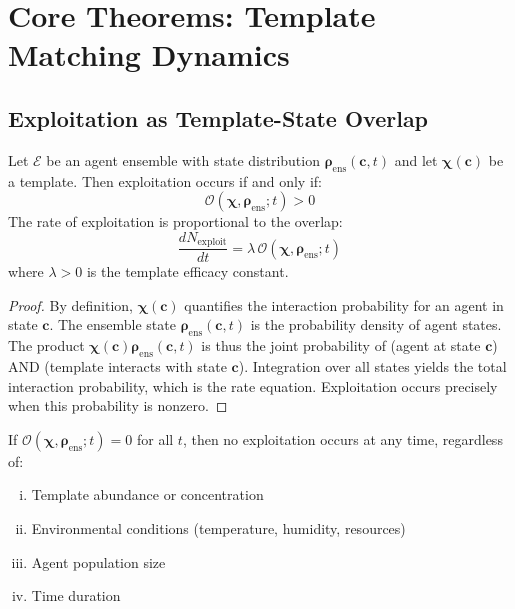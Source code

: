 \documentclass[11pt,twocolumn,a4paper]{article}
\newcommand{\Template}{\boldsymbol{\chi}}
\newcommand{\State}{\boldsymbol{\rho}}
\newcommand{\Overlap}{\mathcal{O}}
\begin{document}
\section{Core Theorems: Template Matching Dynamics}
\label{sec:core_theorems}

\subsection{Exploitation as Template-State Overlap}

\begin{theorem}
\label{thm:exploit_overlap}
Let $\mathcal{E}$ be an agent ensemble with state distribution $\State_{\mathrm{ens}}(\mathbf{c}, t)$ and let $\Template(\mathbf{c})$ be a template. Then exploitation occurs if and only if:
\begin{equation}
\Overlap(\Template, \State_{\mathrm{ens}}; t) > 0
\label{eq:exploit_condition}
\end{equation}
The rate of exploitation is proportional to the overlap:
\begin{equation}
\frac{dN_{\mathrm{exploit}}}{dt} = \lambda \, \Overlap(\Template, \State_{\mathrm{ens}}; t)
\label{eq:exploit_rate}
\end{equation}
where $\lambda > 0$ is the template efficacy constant.
\end{theorem}

\begin{proof}
By definition, $\Template(\mathbf{c})$ quantifies the interaction probability for an agent in state $\mathbf{c}$. The ensemble state $\State_{\mathrm{ens}}(\mathbf{c}, t)$ is the probability density of agent states. The product $\Template(\mathbf{c}) \State_{\mathrm{ens}}(\mathbf{c}, t)$ is thus the joint probability of (agent at state $\mathbf{c}$) AND (template interacts with state $\mathbf{c}$). Integration over all states yields the total interaction probability, which is the rate equation. Exploitation occurs precisely when this probability is nonzero.
\end{proof}

\begin{corollary}
If $\Overlap(\Template, \State_{\mathrm{ens}}; t) = 0$ for all $t$, then no exploitation occurs at any time, regardless of:
\begin{enumerate}[(i)]
\item Template abundance or concentration
\item Environmental conditions (temperature, humidity, resources)
\item Agent population size
\item Time duration
\end{enumerate}
\end{corollary}
\end{document}
